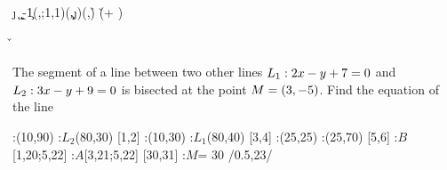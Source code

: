


\setcounter{rolldice}{0}


\MULTIPLY{}\j
\MULTIPLY{}\k
\ADD\vbfive\vbsix\a
\SUBTRACT\a\k\b
\MULTIPLY\b{-1}\c
\SOLVELINEARSYSTEM(\vbthree,\vbfour;1,1)(\c,\j)(\g,\h)
\EXPR[0]\v{(\vbthree * \g + \vbfive)}
\EXPR[0]\w{(\vbfour * \h + \vbsix)}

\SUBTRACT\v\vbtwo\pp
\SUBTRACT\g\vbone\qq
\FRACTIONSIMPLIFY\pp\qq\p\q
\EXPR[0]{\acn}{(\q * \vbtwo - \p * \vbone)}

\question[4] The segment of a line between two other lines $L_1: 2 x - y + 7 = 0$ and $L_2: 3 x -y + 9 = 0$ 
is bisected at the point $M = (3, -5)$. Find the equation of the line


\watchout[-10pt]

\ifprintanswers
  \begin{marginfigure}[30pt]
      :(10,90)
      :$L_2$(80,30)
       [1,2]
      :(10,30)
      :$L_1$(80,40)
       [3,4]
      :(25,25)
      :(25,70)
       [5,6]
      :$B$[1,20;5,22]
      :$A$[3,21;5,22]
       [30,31]
      :$M$= 30 /0.5,23/
    \figdrawbegin{}
      \figdrawline [1,2]
      \figdrawline [3,4]
      \figdrawline [30,31]
    \figdrawend
    \centerline{\box\figBoxA}
  \end{marginfigure}
\fi 

